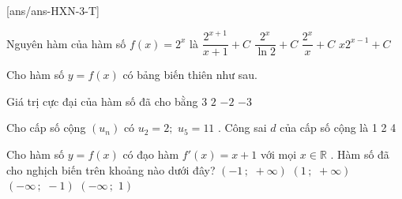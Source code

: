 \def\sode{3}
\begin{name}
	{\tenchude}
	{\tendethi}
	{\tentruong}
	{\thoigian}
\end{name}
\caulc
{}[ans/ans-HXN-\sode-T]
\begin{ex}%
 Nguyên hàm của hàm số $f(x)=2^x$ là
 \choice
 {$\dfrac{2^{x+1}}{x+1}+C$}
 {\True $\dfrac{2^x}{\ln 2}+C$}
 {$\dfrac{2^x}{x}+C$}
 {$x{2^{x-1}}+C$}
\end{ex}
\begin{ex}%
 Cho hàm số $y=f(x)$ có bảng biến thiên như sau.
 \begin{center}
 \end{center}
 Giá trị cực đại của hàm số đã cho bằng
 \choice
 {$3$}
 {\True $2$}
 {$-2$}
 {$-3$}
\end{ex}
\begin{ex}%
 Cho cấp số cộng $\left(u_n\right)$ có $u_2=2;\,\,u_5=11$ . Công sai $d$ của cấp số cộng là
 \choice
 {1}
 {2}
 {4}
 {}
\end{ex}
\begin{ex}%
 Cho hàm số $y=f(x)$ có đạo hàm $f'(x)=x+1$ với mọi $x\in\mathbb{R}$ . Hàm số đã cho nghịch biến trên khoảng nào dưới đây?
 \choice
 {$\left(-1\,;\,\,+\infty\right)$}
 {$\left(1\,;\,\,+\infty\right)$}
 {\True $\left(-\infty\,;\,\,-1\right)$}
 {$\left(-\infty\,;\,\,1\right)$}
\end{ex}
